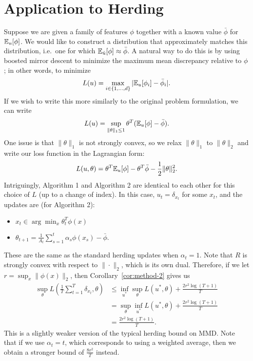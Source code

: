 \documentclass[paper.tex]{subfiles}
\begin{document}
\section{Application to Herding}
\label{sec:herding}

Suppose we are given a family of features $\phi$ together 
with a known value $\bar{\phi}$ for $\mathbb{E}_{u}[\phi]$. We 
would like to construct a distribution that approximately 
matches this distribution, i.e.~one for which 
$\mathbb{E}_{\hat{u}}[\phi] \approx \bar{\phi}$. A natural way 
to do this is by using boosted mirror descent to minimize the 
maximum mean discrepancy relative to $\phi$; 
in other words, to minimize
\[ L(u) = \max_{i \in \{1,\dots,d\}} |\mathbb{E}_{u}[\phi_i]-\bar{\phi}_i|. \]
If we wish to write this more similarly to the original problem 
formulation, we can write
\[ L(u) = \sup_{\|\theta\|_1 \leq 1} \theta^T(\mathbb{E}_{u}[\phi]-\bar{\phi}). \]
One issue is that $\|\theta\|_1$ is not strongly convex, so we relax $\|\theta\|_1$ 
to $\|\theta\|_2$ and write our loss function in the Lagrangian form:
\[ L(u, \theta) = \theta^T\mathbb{E}_{u}[\phi] - \theta^T\bar{\phi} - \frac{1}{2}\|\theta\|_2^2. \]
Intriguingly, Algorithm 1 and Algorithm 2 are identical to each other for this choice of $L$ 
(up to a change of index). In this case, $u_t = \delta_{x_t}$ for some $x_t$, and 
the updates are (for Algorithm 2):
\begin{itemize}
\item $x_t \in \arg\min_{x} \theta_t^T\phi(x)$
\item $\theta_{t+1} = \frac{1}{A_t} \sum_{s=1}^t \alpha_s \phi(x_{s}) - \bar \phi$.
\end{itemize}
These are the same as the standard herding updates when 
$\alpha_t = 1$. Note that $R$ is strongly convex with respect to 
$\|\cdot\|_2$, which is its own dual. Therefore, if we let
$r = \sup_{x} \|\phi(x)\|_2$, then Corollary~\ref{cor:method-2} gives us
\begin{align*}
\sup_{\theta} L\left(\frac{1}{T} \sum_{t=1}^T \delta_{x_t}, \theta\right) &\leq \inf_{u^*} \sup_{\theta} L(u^*, \theta) + \frac{2r^2\log(T+1)}{T} \\
 &= \sup_{\theta} \inf_{u^*} L(u^*, \theta) + \frac{2r^2\log(T+1)}{T} \\
 &= \frac{2r^2\log(T+1)}{T}.
\end{align*}
This is a slightly weaker version of the typical herding bound on MMD.
Note that if we use $\alpha_t = t$, which corresponds to using a weighted 
average, then we obtain a stronger bound of $\frac{8r^2}{T}$ instead.
\end{document}
